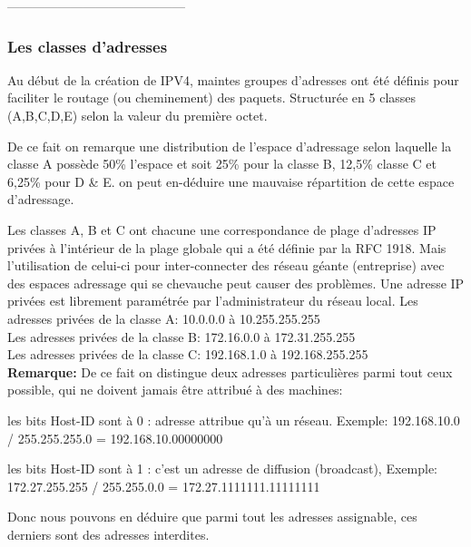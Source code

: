 ------------------------------------------


\subsubsection{Les classes d’adresses}
Au début de la création de IPV4, maintes groupes d’adresses ont été définis
pour faciliter le routage (ou cheminement) des paquets. Structurée en 5 classes
(A,B,C,D,E) selon la valeur du première octet.


De ce fait on remarque une distribution de l’espace d’adressage selon laquelle
la classe A possède 50\% l’espace et soit 25\% pour la classe B, 12,5\% classe
C et 6,25\% pour D \& E. on peut en-déduire une mauvaise répartition de cette
espace d’adressage. 

Les classes A, B et C ont chacune une correspondance de plage
d’adresses IP privées à l’intérieur de la plage globale qui a été définie par
la RFC 1918. Mais l’utilisation  de celui-ci pour inter-connecter des réseau
géante (entreprise) avec des espaces adressage qui se chevauche peut causer des
problèmes. Une adresse IP privées est librement paramétrée par l’administrateur
du réseau local.
Les adresses privées de la classe A: 10.0.0.0 à 10.255.255.255\\
Les adresses privées de la classe B: 172.16.0.0 à 172.31.255.255\\
Les adresses privées de la classe C: 192.168.1.0 à 192.168.255.255\\


\textbf{Remarque:}
De ce fait on distingue deux adresses particulières parmi tout ceux possible,
qui ne doivent jamais être attribué à des machines:

     les bits Host-ID sont à 0 : adresse attribue qu’à un réseau.
Exemple: 192.168.10.0 / 255.255.255.0 = 192.168.10.00000000

    les bits Host-ID sont à 1 : c’est un adresse de  diffusion (broadcast),
Exemple: 172.27.255.255 / 255.255.0.0 = 172.27.1111111.11111111

Donc nous pouvons en déduire que parmi tout les adresses assignable, ces
derniers sont des adresses interdites.




